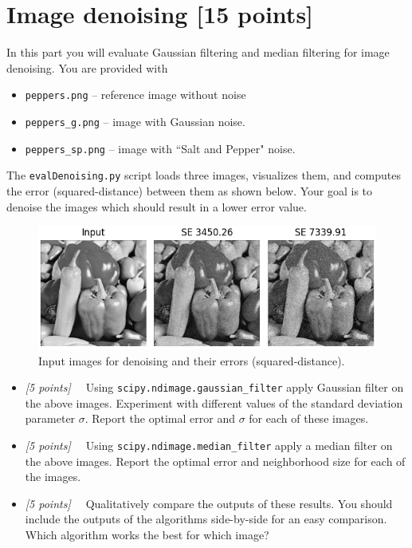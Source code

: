 \documentclass[10pt,letterpaper]{article}
\newcommand{\cmd}[1] {{\color{blue}\texttt{#1}}}
\newcommand{\points}[1]{{\color{mygreen}\emph{[#1]\ \ }}}
\begin{document}
\section{Image denoising [15 points]}
In this part you will evaluate Gaussian filtering and median filtering
for image denoising. You are provided with
\begin{itemize}
\item \texttt{peppers.png} -- reference image without noise
\item \texttt{peppers\_g.png}  -- image with Gaussian noise. 
\item \texttt{peppers\_sp.png}  -- image with ``Salt and Pepper" noise.
\end{itemize}

The \cmd{evalDenoising.py} script loads three images, visualizes them, and
computes the error (squared-distance) between them as shown
below.
Your goal is to denoise the images which should result in a
lower error value.


\begin{figure}[h]
\centering
\includegraphics[width=0.8\linewidth]{fig/denoising-output-peppers.png}
\caption{\label{fig:bayer} Input images for denoising and their errors (squared-distance).}
\end{figure}

\begin{itemize}
\item \points{5 points} Using \cmd{scipy.ndimage.gaussian\_filter}
  apply Gaussian filter on the above images.
  Experiment with different values of the
  standard deviation parameter $\sigma$. Report the optimal error and
  $\sigma$ for each of these images.
 
\item \points{5 points} Using \cmd{scipy.ndimage.median\_filter} apply
  a median filter on the above images. Report the optimal error and neighborhood
  size for each of the images.
  
\item \points{5 points} Qualitatively compare the outputs of these
  results. You should include the outputs of the algorithms
  side-by-side for an easy comparison. Which algorithm works the best
  for which image?

\end{itemize}
\end{document}
